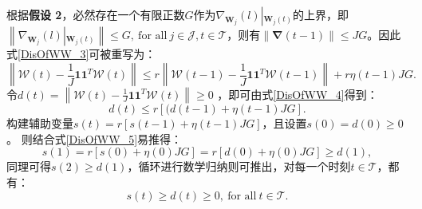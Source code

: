 根据\textbf{假设 2}，必然存在一个有限正数$G$作为$\nabla_{\boldsymbol W_j}\left(l\right)\left|_{\boldsymbol W_j\left(t\right)}\right.$的上界，即$\left\|\nabla_{\boldsymbol W_j}\left(l\right)\left|_{\boldsymbol W_j\left(t\right)}\right.\right\|\leq G,~\text{for all}~
j\in\mathcal{J},t\in\mathcal{T}$，则有$\left\|\boldsymbol{\nabla}\left(t-1\right)\right\|\leq JG$。因此式\eqref{DisOfWW_3}可被重写为：
\begin{equation}
    \label{DisOfWW_4}
    \left\|\boldsymbol{\mathcal{W}}\left(t\right) - \frac{1}{J}\boldsymbol1\boldsymbol1^T\boldsymbol{\mathcal{W}}\left(t\right)\right\|    \leq
    r \left\|\boldsymbol{\mathcal{W}}\left(t-1\right) - \frac{1}{J}\boldsymbol1\boldsymbol1^T\boldsymbol {\mathcal{W}}\left(t-1\right)\right\|
    + r\eta\left(t-1\right)JG.
\end{equation}
令$d\left(t\right)=\left\|\boldsymbol{\mathcal{W}}\left(t\right) - \frac{1}{J}\boldsymbol1\boldsymbol1^T\boldsymbol{\mathcal{W}}\left(t\right)\right\|\geqslant0$
，即可由式\eqref{DisOfWW_4}得到：
\begin{equation}
    \label{DisOfWW_5}
    d\left(t\right) \leq r\left[(d\left(t-1\right)+\eta\left(t-1\right)JG\right].
\end{equation}
构建辅助变量$s\left(t\right)=r\left[s\left(t-1\right)+\eta\left(t-1\right)JG\right]$，且设置$s\left(0\right)=d\left(0\right)\geqslant0$。
则结合式\eqref{DisOfWW_5}易推得：
\begin{equation}
    \label{temp_sd_1}
    s\left(1\right)=r\left[s\left(0\right)+\eta\left(0\right)JG\right]
    =r\left[d\left(0\right)+\eta\left(0\right)JG\right] \geqslant d\left(1\right),
\end{equation}
同理可得$s\left(2\right) \geqslant d\left(1\right)$，循环进行数学归纳则可推出，对每一个时刻$t\in\mathcal{T}$，都有：
\begin{equation}
    \label{temp_s}
    s\left(t\right) \geqslant d\left(t\right) \geqslant 0,~\text{for all}~t \in \mathcal{T}.
\end{equation}

